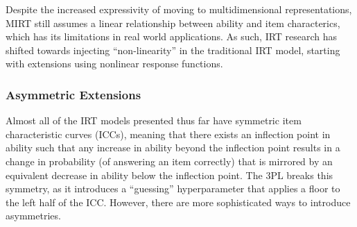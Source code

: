 Despite the increased expressivity of moving to multidimensional representations, MIRT still assumes a linear relationship between ability and item characterics, which has its limitations in real world applications. As such, IRT research has shifted towards injecting ``non-linearity'' in the traditional IRT model, starting with extensions using nonlinear response functions.

\subsubsection{Asymmetric Extensions}

Almost all of the IRT models presented thus far have symmetric item characteristic curves (ICCs), meaning that there exists an inflection point in ability such that any increase in ability beyond the inflection point results in a change in probability (of answering an item correctly) that is mirrored by an equivalent decrease in ability below the inflection point.
The 3PL breaks this symmetry, as it introduces a ``guessing'' hyperparameter that applies a floor to the left half of the ICC. 
However, there are more sophisticated ways to introduce asymmetries. 

